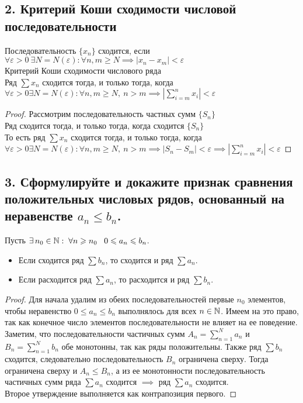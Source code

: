 \documentclass[a4paper, fleqn]{article}
\begin{document}
        \subsection*{2. Критерий Коши сходимости числовой последовательности}
        Последовательность $\{x_n\}$ сходится, если $\forall \varepsilon > 0\ \exists N = N(\varepsilon) : \forall n, m \geqslant N \implies |x_n - x_m| < \varepsilon$\\
        Критерий Коши сходимости числового ряда\\
        Ряд $\sum x_n$ сходится тогда, и только тогда, когда $\forall\varepsilon > 0 \exists N = N(\varepsilon) : \forall n, m \geqslant N,\ n > m \implies |\sum\limits_{i = m}^n x_i| < \varepsilon$
\begin{proof}
        Рассмотрим последовательность частных сумм $\{S_n\}$\\
        Ряд сходится тогда, и только тогда, когда сходится $\{S_n\}$\\
        То есть ряд $\sum x_n$ сходится тогда, и только тогда, когда $\forall \varepsilon > 0 \exists N = N(\varepsilon) : \forall n, m \geqslant N,\ n > m \implies |S_n - S_m| < \varepsilon \implies |\sum\limits_{i = m}^n x_i| < \varepsilon$
\end{proof}

    \subsection*{3. Сформулируйте и докажите признак сравнения положительных числовых рядов, основанный на неравенстве $a_n \leqslant b_n$.}

    Пусть $\exists \, n_0 \in \mathbb{N} : \; \forall n \geqslant n_0 \;\;\; 0 \leqslant a_n \leqslant b_n$.

    \begin{itemize}
        \item Если сходится ряд $\sum b_n$, то сходится и ряд $\sum a_n$.
        \item Если расходится ряд $\sum a_n$, то расходится и ряд $\sum b_n$.
    \end{itemize}

    \begin{proof}
        Для начала удалим из обеих последовательностей первые $n_0$ элементов, чтобы неравенство $0 \leqslant a_n \leqslant b_n$ выполнялось для всех 
	$n \in \mathbb{N}$. Имеем на это право, так как конечное число элементов последовательности не влияет на ее поведение.
        \\[6 pt]
        Заметим, что последовательности частичных сумм $A_n = \sum \limits_{n = 1}^N a_n$ и $B_n = \sum \limits_{n = 1}^N b_n$ обе монотонны, так как
	ряды положительны. Также ряд $\sum b_n$ сходится, следовательно последовательность $B_n$ ограничена сверху. Тогда ограничена сверху и
	$A_n \leqslant B_n$, а из ее монотонности последовательность частичных сумм ряда $\sum a_n$ сходится $\implies$ ряд $\sum a_n$ сходится.
        \\[6 pt]
        Второе утверждение выполняется как контрапозиция первого.
    \end{proof}
    
\end{document}

